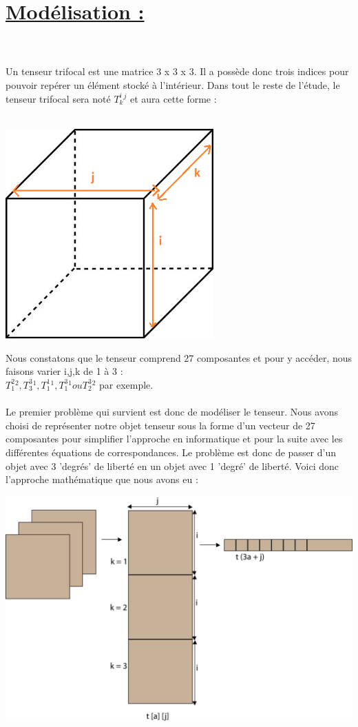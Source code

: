 \documentclass[a4paper,11pt,fleqn]{report}
\begin{document}
	\section{\underline{Mod\'elisation :}}
	\\\\
	Un tenseur trifocal est une matrice 3 x 3 x 3. Il a poss\`ede donc trois indices pour pouvoir rep\'erer un \'el\'ement stock\'e \`a l'int\'erieur. Dans tout le reste de l'\'etude, le tenseur trifocal sera not\'e $T_k^i^j$ et aura cette forme :\\\\
	\begin{center}\includegraphics[width=0.60\textwidth]{./tenseur.png}\end{center}
	Nous constatons que le tenseur comprend 27 composantes et pour y acc\'eder, nous faisons varier i,j,k de 1 \`a 3 : \\ $T_1^2^2 , T_3^3^1 , T_1^1^1 , T_1^3^1 ou T_2^3^2 $ par exemple.\\\\Le premier probl\`eme qui survient est donc de mod\'eliser le tenseur. Nous avons choisi de repr\'esenter notre objet tenseur sous la forme d'un vecteur de 27 composantes pour simplifier l'approche en informatique et pour la suite avec les diff\'erentes \'equations de correspondances. Le probl\`eme est donc de passer d'un objet avec 3 'degr\'es' de libert\'e en un objet avec 1 'degr\'e' de libert\'e. Voici donc l'approche math\'ematique que nous avons eu :
	\\
	\begin{center}\includegraphics[width=1.2\textwidth]{./schema1.png}\end{center}
\end{document}
